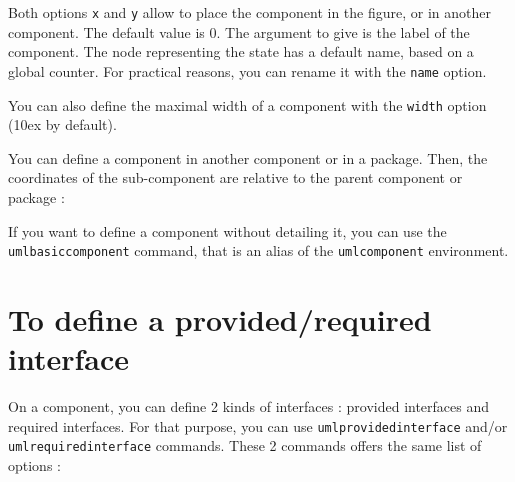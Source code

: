 \documentclass[a4paper,11pt]{report}
\newcommand{\inputTikZ}[1]{%
  }%
\newcommand{\inputTikZ}[1]{%
    \texttt{[image: fig/\#1.pdf]}%
  }%
\begin{document}
\medskip

Both options {\tt x} and {\tt y} allow to place the component in the figure, or in another component. The default value is 0. 
The argument to give is the label of the component. The node representing the state has a default name, based on a global counter. For practical reasons, you can rename it with the {\tt name} option.

\medskip

You can also define the maximal width of a component with the {\tt width} option (10ex by default).

\medskip

You can define a component in another component or in a package. Then, the coordinates of the sub-component are relative to the parent component or package :

\medskip

\begin{minipage}{0.51\textwidth}

\end{minipage}
\begin{minipage}{0.49\textwidth}
\begin{center}
\inputTikZ{componentinner}
\end{center}
\end{minipage}

\medskip

If you want to define a component without detailing it, you can use the {\tt umlbasiccomponent} command, that is an alias of the {\tt umlcomponent} environment.

\section{To define a provided/required interface}

On a component, you can define 2 kinds of interfaces : provided interfaces and required interfaces. For that purpose, you can use {\tt umlprovidedinterface} and/or {\tt umlrequiredinterface} commands.
These 2 commands offers the same list of options :

\medskip

\begin{minipage}{0.45\textwidth}

\end{minipage}
\begin{minipage}{0.55\textwidth}
\begin{center}
\inputTikZ{componentinterface}
\end{center}
\end{minipage}
\end{document}
